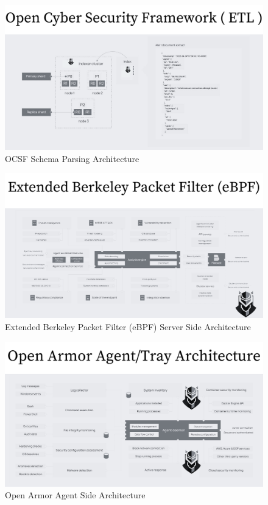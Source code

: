 \begin{figure}[h]
    \centering
    \includegraphics[width=1\linewidth]{ocsf-etl.png}
    \caption{OCSF Schema Parsing Architecture}
    \label{fig:ocsf-architecture}
\end{figure}

\begin{figure}[h]
    \centering
    \includegraphics[width=1\linewidth]{ebpf-server.png}
    \caption{Extended Berkeley Packet Filter (eBPF) Server Side Architecture}
    \label{fig:ebpf-architecture}
\end{figure}

\begin{figure}[h]
    \centering
    \includegraphics[width=1\linewidth]{openarmor-agent.png}
    \caption{Open Armor Agent Side Architecture}
    \label{fig:agent-architecture}
\end{figure}

